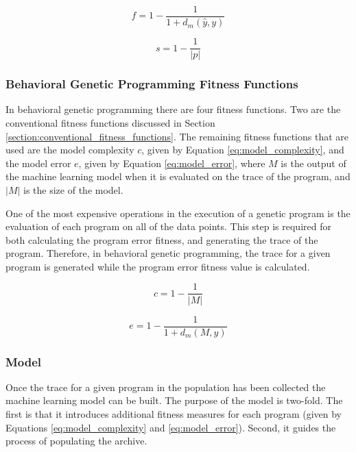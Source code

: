 \begin{equation}
\label{eq:program_error}
f = 1 - \frac{1}{1 + d_{m}(\hat y, y)}
\end{equation}

\begin{equation}
\label{eq:program_size}
s = 1 - \frac{1}{|p|}
\end{equation}

\subsubsection{Behavioral Genetic Programming Fitness Functions}
In behavioral genetic programming there are four fitness functions.  Two are the conventional fitness functions discussed in Section \ref{section:conventional_fitness_functions}.  The remaining fitness functions that are used are the model complexity $c$, given by Equation \ref{eq:model_complexity}, and the model error $e$, given by Equation \ref{eq:model_error}, where $M$ is the output of the machine learning model when it is evaluated on the trace of the program, and $|M|$ is the size of the model.


One of the most expensive operations in the execution of a genetic program is the evaluation of each program on all of the data points.  This step is required for both calculating the program error fitness, and generating the trace of the program.  Therefore, in behavioral genetic programming, the trace for a given program is generated while the program error fitness value is calculated.

\begin{equation}
\label{eq:model_complexity}
c = 1 - \frac{1}{|M|}
\end{equation}

\begin{equation}
\label{eq:model_error}
e = 1 - \frac{1}{1 + d_{m}(M, y)}
\end{equation}

\subsubsection{Model}
\label{section:model}
Once the trace for a given program in the population has been collected the machine learning model can be built.  The purpose of the model is two-fold.  The first is that it introduces additional fitness measures for each program (given by Equations \ref{eq:model_complexity} and \ref{eq:model_error}).  Second, it guides the process of populating the archive.

